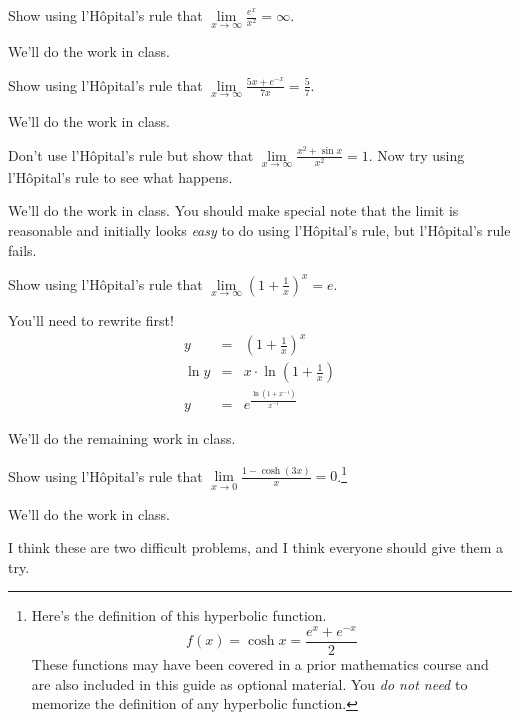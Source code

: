 \documentclass[12pt,addpoints, answers, fleqn]{exam}
\begin{document}
\begin{questions}
\question Show using  l'H\^{o}pital's rule that $\displaystyle \mathop {\lim }\limits_{ x \to \infty} \frac{e^x}{x^2} = \infty$.
\begin{solution}
We'll do the work in class.
\end{solution}


\question Show using  l'H\^{o}pital's rule that $\displaystyle \mathop {\lim }\limits_{ x \to \infty} \frac{5x + e^{-x}}{7x} = \frac{5}{7}$.
\begin{solution}
We'll do the work in class.
\end{solution}


\question Don't use l'H\^{o}pital's rule but show that $\displaystyle \mathop {\lim }\limits_{ x \to \infty} \frac{x^2 + \sin x}{x^2} = 1$. Now try using l'H\^{o}pital's rule to see what happens.
\begin{solution}
We'll do the work in class. You should make special note that the limit is reasonable and initially looks \emph{easy} to do using l'H\^{o}pital's rule, but l'H\^{o}pital's rule fails.
\end{solution}


\question Show using  l'H\^{o}pital's rule that $\displaystyle \mathop {\lim }\limits_{ x \to \infty} \left(1+\frac{1}{x}\right)^x = e$.
\begin{solution}
You'll need to rewrite first!
\begin{eqnarray*}
y &=& \left(1+\frac{1}{x}\right)^x\\
\ln y &=&x \cdot \ln  \left(1+\frac{1}{x}\right)\\
y &=& e^{\frac{\ln  \left(1+x^{-1}\right)}{x^{-1}}}
\end{eqnarray*}

We'll do the remaining work in class.
\end{solution}


\question Show using  l'H\^{o}pital's rule that $\displaystyle \mathop {\lim }\limits_{ x \to 0} \frac{1 - \cosh \left( 3x \right)}{x} = 0$.\footnote{Here's the definition of this hyperbolic function.
\[
f\left( x \right) = \cosh x = \frac{e^x + e^{-x}}{2}
\]
These functions may have been covered in a prior mathematics course and are also included in this guide as  optional material. You \emph{do not need} to memorize the definition of any hyperbolic function.}
\begin{solution}
We'll do the work in class.
\end{solution}


\question I think these are two difficult problems, and I think everyone should give them a try.
\begin{parts}

\end{parts}
\end{questions}
\end{document}
